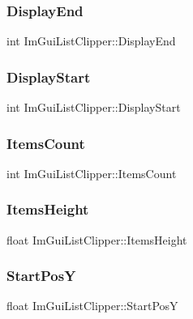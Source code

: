 \subsubsection{\texorpdfstring{Display\+End}{DisplayEnd}}
{\footnotesize\ttfamily int Im\+Gui\+List\+Clipper\+::\+Display\+End}

\hypertarget{struct_im_gui_list_clipper_a9d096e06e5633fd77a8a209c00fe454a}{}\label{struct_im_gui_list_clipper_a9d096e06e5633fd77a8a209c00fe454a} 
\subsubsection{\texorpdfstring{Display\+Start}{DisplayStart}}
{\footnotesize\ttfamily int Im\+Gui\+List\+Clipper\+::\+Display\+Start}

\hypertarget{struct_im_gui_list_clipper_a4e2b4e8efe10615d04ad2aeea467f522}{}\label{struct_im_gui_list_clipper_a4e2b4e8efe10615d04ad2aeea467f522} 
\subsubsection{\texorpdfstring{Items\+Count}{ItemsCount}}
{\footnotesize\ttfamily int Im\+Gui\+List\+Clipper\+::\+Items\+Count}

\hypertarget{struct_im_gui_list_clipper_a19762cb78ff0adccb414027c25678a60}{}\label{struct_im_gui_list_clipper_a19762cb78ff0adccb414027c25678a60} 
\subsubsection{\texorpdfstring{Items\+Height}{ItemsHeight}}
{\footnotesize\ttfamily float Im\+Gui\+List\+Clipper\+::\+Items\+Height}

\hypertarget{struct_im_gui_list_clipper_affee91b338520cd4bd59b5b680dcb5ae}{}\label{struct_im_gui_list_clipper_affee91b338520cd4bd59b5b680dcb5ae} 
\subsubsection{\texorpdfstring{Start\+PosY}{StartPosY}}
{\footnotesize\ttfamily float Im\+Gui\+List\+Clipper\+::\+Start\+PosY}

